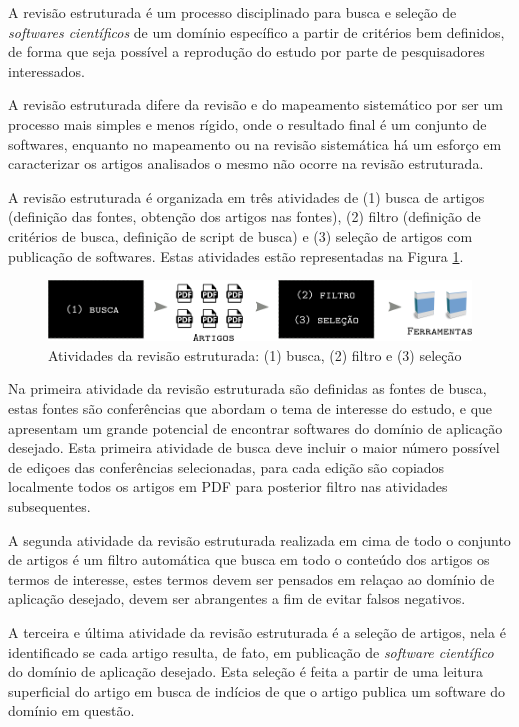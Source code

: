A revisão estruturada é um processo disciplinado para busca e seleção de {\it
softwares científicos} de um domínio específico a partir de critérios bem
definidos, de forma que seja possível a reprodução do estudo por parte de
pesquisadores interessados.

A revisão estruturada difere da revisão e do mapeamento sistemático por ser um
processo mais simples e menos rígido, onde o resultado final é um conjunto de
softwares, enquanto no mapeamento ou na revisão sistemática há um esforço em
caracterizar os artigos analisados o mesmo não ocorre na revisão estruturada.

A revisão estruturada é organizada em três atividades de (1) busca de artigos
(definição das fontes, obtenção dos artigos nas fontes), (2) filtro (definição
de critérios de busca, definição de script de busca) e (3) seleção de artigos
com publicação de softwares. Estas atividades estão representadas na Figura
\ref{figura-revisao-estruturada}.

\begin{figure}[h]
  \center
  \includegraphics[scale=0.33]{imagens/revisao-estruturada.png}
  \caption{Atividades da revisão estruturada: (1) busca, (2) filtro e (3) seleção}
  \label{figura-revisao-estruturada}
\end{figure}

Na primeira atividade da revisão estruturada são definidas as fontes de busca,
estas fontes são conferências que abordam o tema de interesse do estudo, e que
apresentam um grande potencial de encontrar softwares
do domínio de aplicação desejado. Esta primeira atividade de busca deve
incluir o maior número possível de ediçoes das conferências selecionadas, para
cada edição são copiados localmente todos os artigos em PDF para posterior
filtro nas atividades subsequentes.

A segunda atividade da revisão estruturada realizada em cima de todo o conjunto
de artigos é um filtro automática que busca em todo o conteúdo dos artigos os
termos de interesse, estes termos devem ser pensados em relaçao ao domínio de aplicação
desejado, devem ser abrangentes a fim de evitar falsos negativos.

A terceira e última atividade da revisão estruturada é a seleção de artigos,
nela é identificado se cada artigo resulta, de fato, em publicação de {\it software científico}
do domínio de aplicação desejado. Esta seleção é feita a partir de uma
leitura superficial do artigo em busca de indícios de que o artigo publica um
software do domínio em questão.

